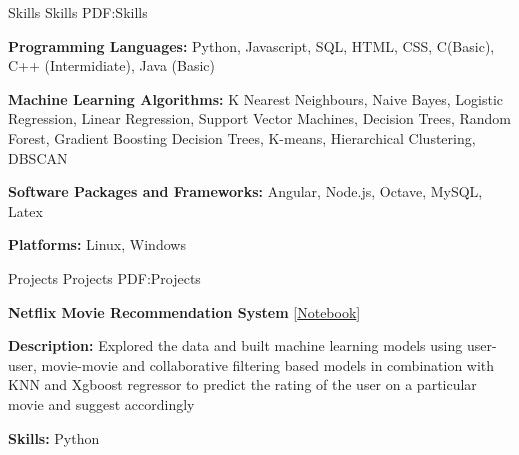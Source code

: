 \documentclass[letterpaper,MMMyyyy,nonstopmode]{simpleresumecv}
\begin{document}
\begin{Body}
            
            \Section
            {Skills}
            {Skills}
            {PDF:Skills}
            
            
                \Entry
                    \textbf{Programming Languages:}
                    Python, Javascript, SQL, HTML, CSS, C(Basic), C++ (Intermidiate), Java (Basic)
                
                    
                \BigGap

                    
                \Entry
                    \textbf{Machine Learning Algorithms:}
                    K Nearest Neighbours, Naive Bayes, Logistic Regression, 
                    Linear Regression, Support Vector Machines, Decision Trees, 
                    Random Forest, Gradient Boosting Decision Trees, K-means, 
                    Hierarchical Clustering, DBSCAN
                
                
                \BigGap


                \Entry
                    \textbf{Software Packages and Frameworks:}
                    Angular, Node.js, Octave, MySQL, Latex
                
                
                \BigGap


                \Entry
                    \textbf{Platforms:}
                    Linux, Windows
                
            
            \Section
            {Projects}
            {Projects}
            {PDF:Projects}


                \Entry
                    \textbf{Netflix Movie Recommendation System}
                    [\href{http://bit.ly/NetflixMovie}{Notebook}]

                    \Gap

                    \Item
                        \textbf{Description:}
                        Explored the data and built machine learning models 
                        using user-user, movie-movie and collaborative filtering 
                        based models in combination with KNN and Xgboost regressor 
                        to predict the rating of the user on a particular 
                        movie and suggest accordingly
                    
                    \Gap

                    \Item
                        \textbf{Skills:}
                        Python
                    


\end{Body}
\end{document}
